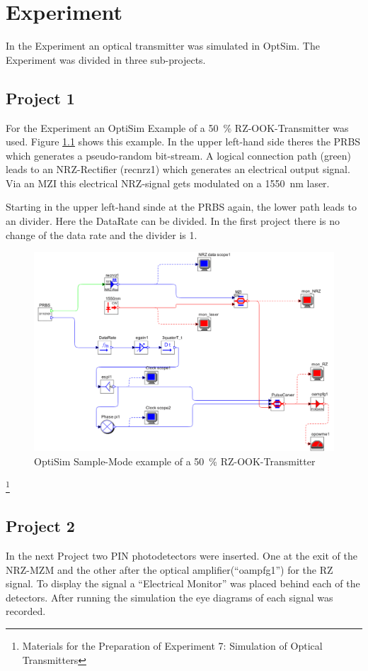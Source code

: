\chapter{Experiment}
\label{ch:experiment}

In the Experiment an optical transmitter was simulated in OptSim. The Experiment was divided in three sub-projects.

\section{Project 1}
\label{sec:P1}
For the Experiment an OptiSim Example of a 50~\% RZ-OOK-Transmitter was used. Figure \ref{fig:P1_aufbau} shows this example\footnotemark[3]. In the upper left-hand side theres the PRBS which generates a pseudo-random bit-stream. A logical connection path (green) leads to an NRZ-Rectifier (recnrz1) which generates an electrical output signal. Via an MZI this electrical NRZ-signal gets modulated on a 1550~nm laser. 

Starting in the upper left-hand sinde at the PRBS again, the lower path leads to an divider. Here the DataRate can be divided. In the first project there is no change of the data rate and the divider is 1. 

\begin{figure}%
\includegraphics[width=\columnwidth]{Grafiken/P1_aufbau.jpg}%
\caption{OptiSim Sample-Mode example of a 50~\% RZ-OOK-Transmitter}%
\label{fig:P1_aufbau}%
\end{figure}


\footnote[3]{Materials for the Preparation of Experiment 7: Simulation of Optical Transmitters}


\section{Project 2}
In the next Project two PIN photodetectors were inserted. One at the exit of the NRZ-MZM and the other after the optical amplifier("`oampfg1"') for the RZ signal. To display the signal a "`Electrical Monitor"' was placed behind each of the detectors. After running the simulation the eye diagrams of each signal was recorded.

